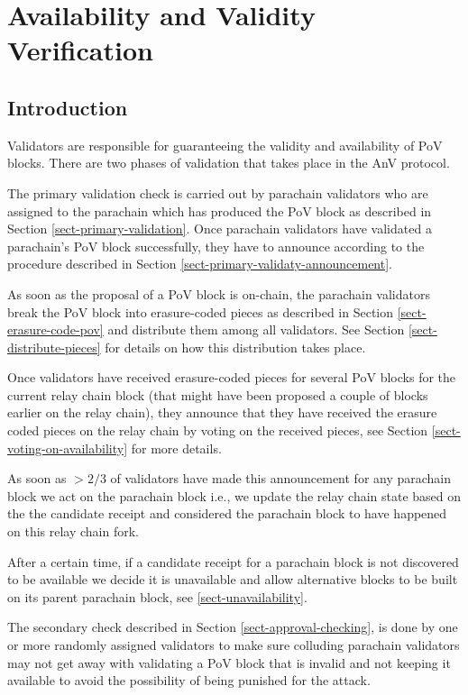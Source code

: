 \chapter{Availability and Validity Verification}

\section{Introduction}

Validators are responsible for guaranteeing the validity and availability of PoV blocks. 
There are two phases of validation that takes place in the AnV protocol. 

The primary validation check is carried out by parachain validators who are assigned to the parachain which has produced the PoV block as described in Section \ref{sect-primary-validation}. Once parachain validators have validated a parachain's PoV block successfully, they have to announce according to the procedure described in Section \ref{sect-primary-validaty-announcement}.

As soon as the proposal of a PoV block is on-chain, the parachain validators break the PoV block into erasure-coded pieces as described in Section \ref{sect-erasure-code-pov} and distribute them among all validators. See Section \ref{sect-distribute-pieces} for details on how this distribution takes place.
	 
Once validators have received erasure-coded pieces for several PoV blocks for the current relay chain block (that might have been proposed a couple of blocks earlier on the relay chain), they announce that they have received the erasure coded pieces on the relay chain by voting on the received pieces, see Section \ref{sect-voting-on-availability} for more details. 

As soon as $>2/3$ of validators have made this announcement for any parachain block we act on the parachain block i.e., we update the relay chain state based on the the candidate receipt and considered the parachain block to have happened on this relay chain fork. 

After a certain time, if a candidate receipt for a parachain block is not discovered to be available we decide it is unavailable and allow alternative blocks to be built on its parent parachain block, see \ref{sect-unavailability}. 

The secondary check described in Section \ref{sect-approval-checking}, is done by one or more randomly assigned validators to make sure colluding parachain validators may not get away with validating a PoV block that is invalid and not keeping it available to avoid the possibility of being punished for the attack.

